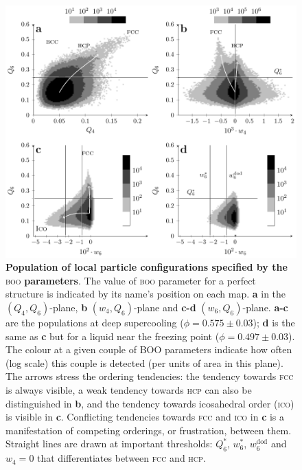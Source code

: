 \clearpage

\begin{figure}
\begin{center}
\includegraphics{fig_maps.pdf}
\end{center}
\caption{\textbf{Population of local particle configurations specified by the }\textsc{boo}\textbf{ parameters}. The value of \textsc{boo} parameter for a perfect structure is  indicated by its name's position on each map. \textbf{a} in the $(Q_4,Q_6)$-plane, \textbf{b} $(w_4,Q_6)$-plane and \textbf{c-d} $(w_6,Q_6)$-plane. \textbf{a-c} are the populations at deep supercooling ($\phi=0.575\pm 0.03$); \textbf{d} is the same as \textbf{c} but for a liquid near the freezing point ($\phi = 0.497 \pm 0.03$). The colour at a given couple of BOO parameters indicate how often (log scale) this couple is detected (per units of area in this plane). The arrows stress the ordering tendencies: the tendency towards \textsc{fcc} is always visible, a weak tendency towards \textsc{hcp} can also be distinguished in \textbf{b}, and the tendency towards icosahedral order (\textsc{ico}) is visible in \textbf{c}. 
Conflicting tendencies towards \textsc{fcc} and \textsc{ico} in \textbf{c} is a manifestation of competing orderings, or frustration, between them. Straight lines are drawn at important thresholds: $Q_6^*$, $w_6^*$, $w_6^\text{dod}$ and $w_4=0$ that differentiates between \textsc{fcc} and \textsc{hcp}.}
	\label{fig:maps}
\end{figure}

